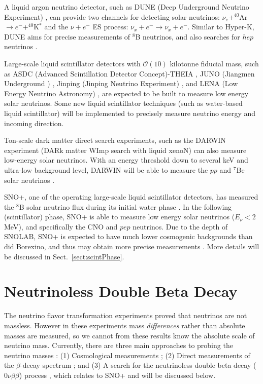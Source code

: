 A liquid argon neutrino detector, such as DUNE (Deep Underground Neutrino Experiment) \cite{websiteDune}, can provide two channels for detecting solar neutrinos: $\nu_e+^{40}$Ar$\to e^-+^{40}$K$^*$ and the $\nu+e^-$ ES process: $\nu_x+e^-\to\nu_x+e^-$. Similar to Hyper-K, DUNE aims for precise measurements of $^8$B neutrinos, and also searches for $hep$ neutrinos \cite{capozzi2019dune}.

Large-scale liquid scintillator detectors with $\mathcal{O}(10)$ kilotonne fiducial mass, such as ASDC (Advanced Scintillation Detector Concept)-THEIA \cite{askins2020theia}, JUNO (Jiangmen Underground ) \cite{giaz2018status}, Jinping (Jinping Neutrino Experiment) \cite{beacom2017physics}, and LENA (Low Energy Neutrino Astronomy) \cite{wurm2013studying}, are expected to be built to measure low energy solar neutrinos. Some new liquid scintillator techniques (such as water-based liquid scintillator) will be implemented to precisely measure neutrino energy and incoming direction. %

Ton-scale dark matter direct search experiments, such as the DARWIN experiment (DARk matter WImp search with liquid xenoN) can also measure low-energy solar neutrinos. With an energy threshold down to several keV and ultra-low background level, DARWIN will be able to measure the $pp$ and $^7$Be solar neutrinos \cite{baudis2014neutrino,aalbers2016darwin,aalbers2020solar}.

SNO+, one of the operating large-scale liquid scintillator detectors, has measured the $^8$B solar neutrino flux during its initial water phase \cite{anderson2019measurement}. In the following (scintillator) phase, SNO+ is able to measure low energy solar neutrinos ($E_\nu<2$ MeV), and specifically the CNO and $pep$ neutrinos. Due to the depth of SNOLAB, SNO+ is expected to have much lower cosmogenic backgrounds than did Borexino, and thus may obtain more precise measurements \cite{directorReview}. More details will be discussed in Sect.~\ref{sect:scintPhase}.

\section{Neutrinoless Double Beta Decay}\label{sect:doublebeta}

The neutrino flavor transformation experiments proved that neutrinos are not massless. However in these experiments mass {\em differences} rather than absolute masses are measured, so we cannot from these results know the absolute scale of neutrino mass. Currently, there are three main approaches to probing the neutrino masses \cite{valle2015neutrinos}: (1) Cosmological measurements \cite{aghanim2020planck,dvorkin2019neutrino,lesgourgues2013neutrino}; (2) Direct measurements of the $\beta$-decay spectrum \cite{aker2019improved}; and (3) A search for the neutrinoless double beta decay ($0\nu\beta\beta$) process \cite{furry1939transition,haxton1981double}, which relates to SNO+ and will be discussed below.

